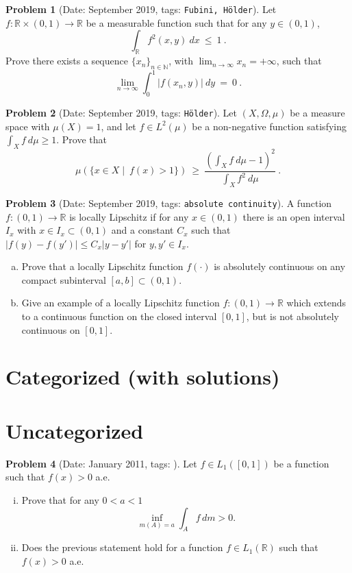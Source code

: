 \documentclass[11pt, notitlepage]{article}
\theoremstyle{definition}
\theoremstyle{definition}
\theoremstyle{definition}
\newtheorem{probstate}{Problem}
\theoremstyle{remark}
\newenvironment{problem}[2]{
    \begin{probstate}[Date: #1, tags: \texttt{#2}]
}
{
  \end{probstate}
}
\begin{document}
\begin{problem}{September 2019}{Fubini, Hölder}
    Let $f:\mathbb{R}\times (0,1)\to\mathbb{R}$ be a measurable function such that for any $y\in(0,1)$,
$$\int_{\mathbb{R}} f^2(x,y) \ dx \ \le \ 1\  .
$$
Prove there exists a sequence $\{x_n\}_{n\in\mathbb{N}}$, with $\lim_{n\to\infty}x_n=+\infty$, such that
$$\lim_{n\to\infty} \int_0^1 |f(x_n,y)| \ dy \ = \ 0 \  .
$$
\end{problem}

\begin{problem}{September 2019}{Hölder}
  Let $(X,\Omega,\mu)$ be a measure space with $\mu(X)=1$, and let $f\in L^2(\mu)$ be a non-negative function satisfying $\int_X f \ d\mu\ge 1$. Prove that
$$
\mu\left(\{x\in X  \mid \ f(x)>1\}\right) \ \ge \  \frac{\left(\int_{X} f \ d\mu-1\right)^2}{\int_X f^2 \ d\mu} \ .
$$
\end{problem}

\begin{problem}{September 2019}{absolute continuity}
   A function $f:(0,1)\to\mathbb{R}$ is locally Lipschitz if for   any $x\in(0,1)$ there is an open interval $I_x$ with $x\in I_x\subset (0,1)$ and a constant $C_x$ such that $|f(y)-f(y')|\le C_x|y-y'|$ for $y,y'\in I_x$.

\begin{enumerate}[(a)]
\item Prove that a locally Lipschitz function $f(\cdot)$ is absolutely continuous on any compact subinterval
$[a,b]\subset (0,1)$.

\item  Give an example of a locally Lipschitz function $f:(0,1)\to\mathbb{R}$ which extends to a continuous function on the closed interval $[0,1]$, but is not absolutely continuous on $[0,1]$.
\end{enumerate}
\end{problem}

\section{Categorized (with solutions)}

\section{Uncategorized}

\begin{problem}{January 2011}{}
  Let $f \in L_1([0,1])$ be a function such that $f(x)>0$ a.e.
 \begin{enumerate}[(i)]
 \item Prove that for any $0<a<1$
 \[
   \inf_{m(A)=a} \int_A f \, dm >0.
 \]
 \item Does the previous statement hold for a function $f \in L_1(\mathbb R)$ such that $f(x)>0$ a.e.
 \end{enumerate}
\end{problem}
\end{document}
